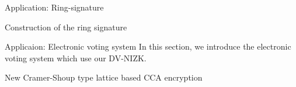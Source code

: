 \begin{section}{Application: Ring-signature}
\begin{subsection}{Construction of the ring signature}
  \end{subsection}
\end{section}

\begin{section}{Applicaion: Electronic voting system}
  In this section, we introduce the electronic voting system which use our DV-NIZK.
  
\end{section}

\begin{section}{New Cramer-Shoup type lattice based CCA encryption}
\end{section}
